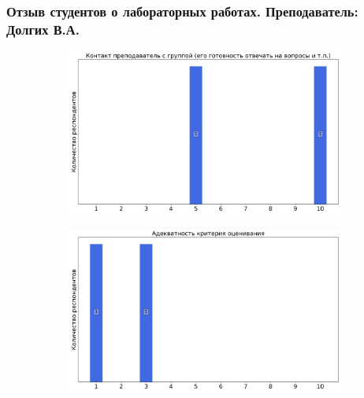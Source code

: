 	\subsubsection{Отзыв студентов о лабораторных работах. Преподаватель: Долгих В.А.}
		\begin{figure}[H]
			\centering
			\begin{subfigure}[b]{0.45\textwidth}
				\centering
				\includegraphics[width=\textwidth]{images/2 course/Общая физика - электричество и магнетизм/labniks-marks-Долгих В.А.-0.png}
			\end{subfigure}
			\begin{subfigure}[b]{0.45\textwidth}
				\centering
				\includegraphics[width=\textwidth]{images/2 course/Общая физика - электричество и магнетизм/labniks-marks-Долгих В.А.-1.png}
			\end{subfigure}
			\begin{subfigure}[b]{0.45\textwidth}
				\centering

\end{subfigure}
\end{figure}
